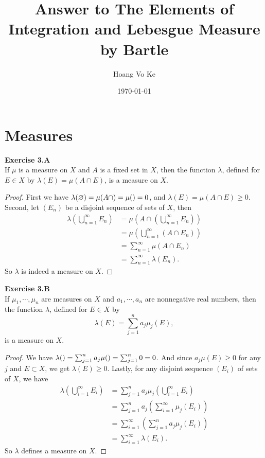 \documentclass[12pt, a4paper]{article}
\title{Answer to The Elements of Integration and Lebesgue Measure by Bartle}
\author{Hoang Vo Ke}
\date{\today}
\theoremstyle{plain}
\newenvironment{exercise}[2][Exercise]
    { \begin{mdframed}[backgroundcolor=gray!20] \textbf{#1 #2} \\}
    {  \end{mdframed}}
\begin{document}
\maketitle


\setcounter{section}{2}
\section{Measures}


\begin{exercise}{3.A}
    If $\mu$ is a measure on $X$ and $A$ is a fixed set in $X$, then the function $\lambda$, defined for $E\in X$ by $\lambda(E)=\mu(A\cap E)$, is a measure on $X$.
\end{exercise}
    \begin{proof}
        First we have $\lambda(\varnothing) = \mu(A\cap \empty) = \mu(\empty) = 0$, and $\lambda(E)=\mu(A\cap E)\geq 0$. Second, let $(E_n)$ be a disjoint sequence of sets of $X$, then
        \begin{align*}
            \lambda\left(\bigcup_{n=1}^{\infty}E_n\right) &= \mu \left(A\cap \left(\bigcup_{n=1}^{\infty}E_n\right)\right)\\
            &=\mu\left(\bigcup_{n=1}^{\infty}(A\cap E_n)\right)\\
            &= \sum_{n=1}^{\infty}\mu(A\cap E_n)\\
            &= \sum_{n=1}^{\infty}\lambda(E_n).
        \end{align*}
        So $\lambda$ is indeed a measure on $X$.
    \end{proof}

\pagebreak

\begin{exercise}{3.B}
    If $\mu_1,\cdots,\mu_n$ are measures on $X$ and $a_1,\cdots,a_n$ are nonnegative real numbers, then the function $\lambda$, defined for $E\in X$ by 
    \[
    \lambda(E) = \sum_{j=1}^{n}a_j\mu_j(E),
    \]
    is a measure on $X$.
\end{exercise}
    \begin{proof}
        We have $\lambda(\empty) = \sum_{j=1}^n a_j\mu(\empty) =\sum_{j=1}^n 0= 0$. And since $a_j\mu(E)\geq 0$ for any $j$ and $E\subset X$, we get $\lambda(E)\geq 0$. Lastly, for any disjoint sequence $(E_i)$ of sets of $X$, we have
        \begin{align*}
            \lambda\left(\bigcup_{i=1}^{\infty}E_i \right) &= \sum_{j=1}^n a_j\mu_j\left(\bigcup_{i=1}^\infty E_i \right)\\
            &=\sum_{j=1}^n a_j\left(\sum_{i=1}^{\infty}\mu_j(E_i)\right)\\
            &=\sum_{i=1}^\infty \left(\sum_{j=1}^n a_j\mu_j(E_i)\right)\\
            &=\sum_{i=1}^\infty \lambda(E_i).
        \end{align*}
        So $\lambda$ defines a measure on $X$.
    \end{proof}
\end{document}
